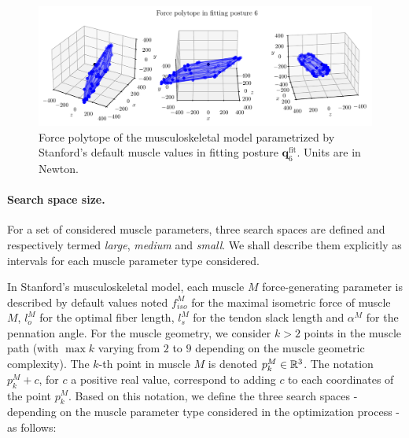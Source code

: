 \begin{figure}[!htb]
    \centering
    \captionsetup{justification=centering}
    \begin{minipage}{\linewidth}
        \centering
        \includegraphics[trim={0 0 0 0}, clip, width=1\linewidth]{img/chapter_4/reconstruction_stanford_imgs/STANFORD_POSTURE_FITTING_06.pdf}
    \end{minipage}
    \caption{Force polytope of the musculoskeletal model parametrized by Stanford's default muscle values in fitting posture $\mathbf{q}_6^{\text{fit}}$. Units are in Newton.}
    \label{fig:polytope_pose_6}
\end{figure}

\clearpage
\paragraph*{Search space size.} For a set of considered muscle parameters, three search spaces are defined and respectively termed \emph{large}, \emph{medium} and \emph{small}. We shall describe them explicitly as intervals for each muscle parameter type considered.

In Stanford's musculoskeletal model, each muscle $M$ force-generating parameter is described by default values noted $f_{iso}^M$ for the maximal isometric force of muscle $M$, $l_o^M$ for the optimal fiber length, $l_s^M$ for the tendon slack length and $\alpha^M$ for the pennation angle. For the muscle geometry, we consider $k > 2$ points in the muscle path (with $\max{k}$ varying from $2$ to $9$ depending on the muscle geometric complexity). The $k$-th point in muscle $M$ is denoted $p_k^M \in \mathbb{R}^3$. The notation $p_k^M + c$, for $c$ a positive real value, correspond to adding $c$ to each coordinates of the point $p_k^M$. Based on this notation, we define the three search spaces - depending on the muscle parameter type considered in the optimization process - as follows:

